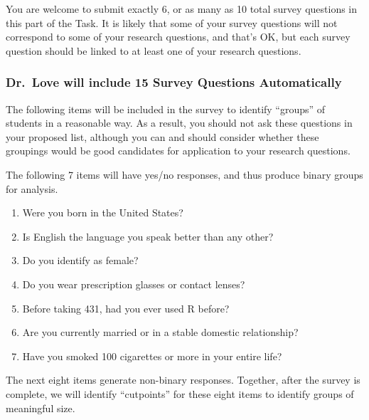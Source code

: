 \documentclass[]{book}
\providecommand{\tightlist}{%
  \setlength{\itemsep}{0pt}\setlength{\parskip}{0pt}}
\theoremstyle{definition}
\theoremstyle{definition}
\theoremstyle{definition}
\theoremstyle{remark}
\begin{document}
You are welcome to submit exactly 6, or as many as 10 total survey
questions in this part of the Task. It is likely that some of your
survey questions will not correspond to some of your research questions,
and that's OK, but each survey question should be linked to at least one
of your research questions.

\hypertarget{dr.love-will-include-15-survey-questions-automatically}{%
\subsubsection{Dr.~Love will include 15 Survey Questions
Automatically}\label{dr.love-will-include-15-survey-questions-automatically}}

The following items will be included in the survey to identify
``groups'' of students in a reasonable way. As a result, you should not
ask these questions in your proposed list, although you can and should
consider whether these groupings would be good candidates for
application to your research questions.

The following 7 items will have yes/no responses, and thus produce
binary groups for analysis.

\begin{enumerate}
\def\labelenumi{\arabic{enumi}.}
\tightlist
\item
  Were you born in the United States?
\item
  Is English the language you speak better than any other?
\item
  Do you identify as female?
\item
  Do you wear prescription glasses or contact lenses?
\item
  Before taking 431, had you ever used R before?
\item
  Are you currently married or in a stable domestic relationship?
\item
  Have you smoked 100 cigarettes or more in your entire life?
\end{enumerate}

The next eight items generate non-binary responses. Together, after the
survey is complete, we will identify ``cutpoints'' for these eight items
to identify groups of meaningful size.
\end{document}
